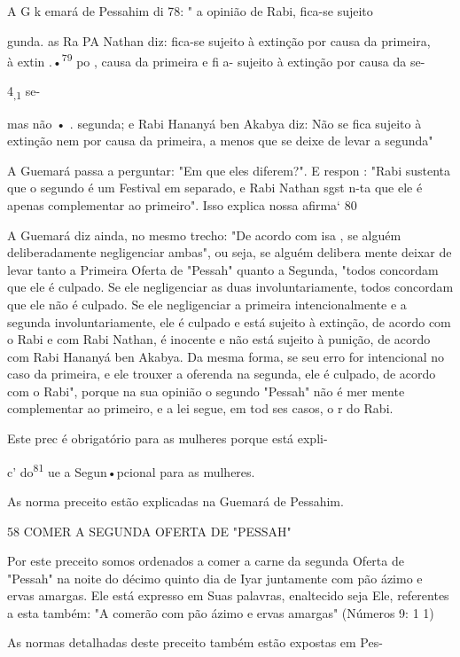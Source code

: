 \begin{itemize}
\begin{enumrate}
\begin{itemize}
\begin{itemize}
A G k emará de Pessahim di 78: " a opinião de Rabi, fica-se sujeito

gunda. as Ra PA Nathan diz: fica-se sujeito à extinção por causa da
primeira,\\
à extin .•\textsuperscript{79} po , causa da primeira
e fi a- sujeito à extinção por causa da se-


4\textsubscript{,1} se-

mas não • . segunda; e Rabi Hananyá ben Akabya diz: Não se fica sujeito
à extinção nem por causa da primeira, a menos que se deixe de levar a
segunda"

A Guemará passa a perguntar: "Em que eles diferem?". E respon : "Rabi
sustenta que o segundo é um Festival em separado, e Rabi Nathan sgst
n-ta que ele é apenas complementar ao primeiro". Isso explica nossa
afirma` 80

A Guemará diz ainda, no mesmo trecho: "De acordo com isa , se alguém
deliberadamente negligenciar ambas", ou seja, se alguém delibera mente
deixar de levar tanto a Primeira Oferta de "Pessah" quanto a Segunda,
"todos concordam que ele é culpado. Se ele negligenciar as duas
involuntaria­mente, todos concordam que ele não é culpado. Se ele
negligenciar a primeira intencionalmente e a segunda involuntariamente,
ele é culpado e está sujeito à extinção, de acordo com o Rabi e com Rabi
Nathan, é inocente e não está sujeito à punição, de acordo com Rabi
Hananyá ben Akabya. Da mesma forma, se seu erro for intencional no caso
da primeira, e ele trouxer a oferenda na se­gunda, ele é culpado, de
acordo com o Rabi", porque na sua opinião o segun­do "Pessah" não é mer
mente complementar ao primeiro, e a lei segue, em tod ses casos, o r do
Rabi.

Este prec é obrigatório para as mulheres porque está expli-

c' do\textsuperscript{81} ue a Segun•pcional para as mulheres.

As norma preceito estão explicadas na Guemará de Pessahim.

58 COMER A SEGUNDA OFERTA DE "PESSAH"

Por este preceito somos ordenados a comer a carne da segunda Oferta de
"Pessah" na noite do décimo quinto dia de Iyar juntamente com pão ázimo
e ervas amargas. Ele está expresso em Suas palavras, enaltecido seja
Ele, refe­rentes a esta também: "A comerão com pão ázimo e ervas
amargas" (Números 9: 1 1)


As normas detalhadas deste preceito também estão expostas em Pes-



\end{itemize}
\end{itemize}
\end{enumrate}
\end{itemize}
